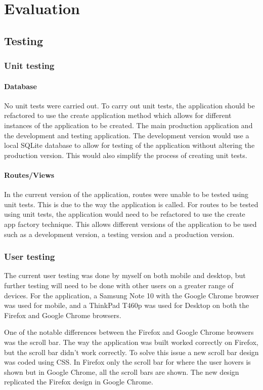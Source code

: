\chapter{Evaluation}
\section{Testing}

\subsection{Unit testing}
\subsubsection{Database}
No unit tests were carried out. To carry out unit tests, the application should be refactored to use the create application method which allows for different instances of the application to be created. The main production application and the development and testing application. The development version would use a local SQLite database to allow for testing of the application without altering the production version. This would also simplify the process of creating unit tests.

\subsubsection{Routes/Views}
In the current version of the application, routes were unable to be tested using unit tests. This is due to the way the application is called. For routes to be tested using unit tests, the application would need to be refactored to use the create app factory technique. This allows different versions of the application to be used such as a development version, a testing version and a production version.

\subsection{User testing}
The current user testing was done by myself on both mobile and desktop, but further testing will need to be done with other users on a greater range of devices. For the application, a Samsung Note 10 with the Google Chrome browser was used for mobile, and a ThinkPad T460p was used for Desktop on both the Firefox and Google Chrome browsers. 

One of the notable differences between the Firefox and Google Chrome browsers was the scroll bar. The way the application was built worked correctly on Firefox, but the scroll bar didn't work correctly. To solve this issue a new scroll bar design was coded using CSS. In Firefox only the scroll bar for where the user hovers is shown but in Google Chrome, all the scroll bars are shown. The new design replicated the Firefox design in Google Chrome. 

